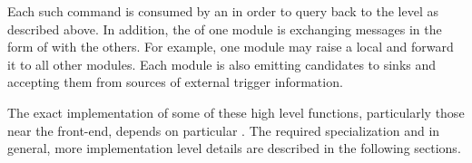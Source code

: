 Each such command is consumed by an  in order to query back
to the  level as described above.
In addition, the  of one module is exchanging messages
in the form of  with the others. 
For example, one module may raise a local 
 and forward it to all other modules.
Each module is also emitting candidates to sinks and accepting them
from sources of external trigger information.

The exact implementation of some of these high level functions,
particularly those near the front-end, depends on particular
. 
The required specialization and in general, more implementation level
details are described in the following sections.

